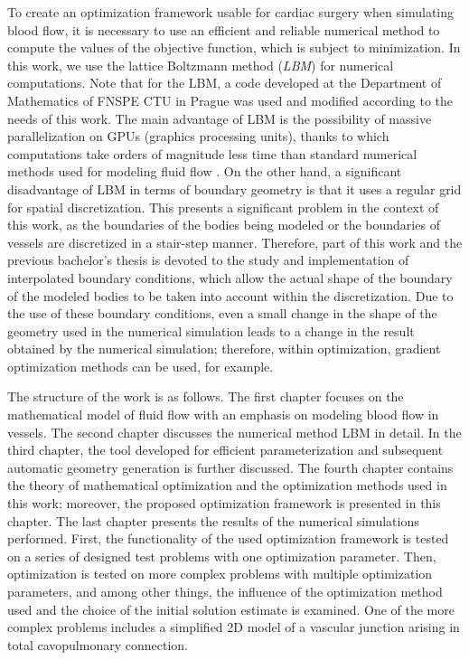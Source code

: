 To create an optimization framework usable for cardiac surgery when simulating blood flow, it is necessary to use an efficient and reliable numerical method to compute the values of the objective function, which is subject to minimization. In this work, we use the lattice Boltzmann method (\textit{LBM}) for numerical computations. Note that for the LBM, a code developed at the Department of Mathematics of FNSPE CTU in Prague was used and modified according to the needs of this work. The main advantage of LBM is the possibility of massive parallelization on GPUs (graphics processing units), thanks to which computations take orders of magnitude less time than standard numerical methods used for modeling fluid flow \cite{PE, Kruger}. On the other hand, a significant disadvantage of LBM in terms of boundary geometry is that it uses a regular grid for spatial discretization. This presents a significant problem in the context of this work, as the boundaries of the bodies being modeled or the boundaries of vessels are discretized in a stair-step manner. Therefore, part of this work and the previous bachelor's thesis \cite{buresBP} is devoted to the study and implementation of interpolated boundary conditions, which allow the actual shape of the boundary of the modeled bodies to be taken into account within the discretization. Due to the use of these boundary conditions, even a small change in the shape of the geometry used in the numerical simulation leads to a change in the result obtained by the numerical simulation; therefore, within optimization, gradient optimization methods can be used, for example.

The structure of the work is as follows. The first chapter focuses on the mathematical model of fluid flow with an emphasis on modeling blood flow in vessels. The second chapter discusses the numerical method LBM in detail. In the third chapter, the tool developed for efficient parameterization and subsequent automatic geometry generation is further discussed. The fourth chapter contains the theory of mathematical optimization and the optimization methods used in this work; moreover, the proposed optimization framework is presented in this chapter. The last chapter presents the results of the numerical simulations performed. First, the functionality of the used optimization framework is tested on a series of designed test problems with one optimization parameter. Then, optimization is tested on more complex problems with multiple optimization parameters, and among other things, the influence of the optimization method used and the choice of the initial solution estimate is examined. One of the more complex problems includes a simplified 2D model of a vascular junction arising in total cavopulmonary connection.



